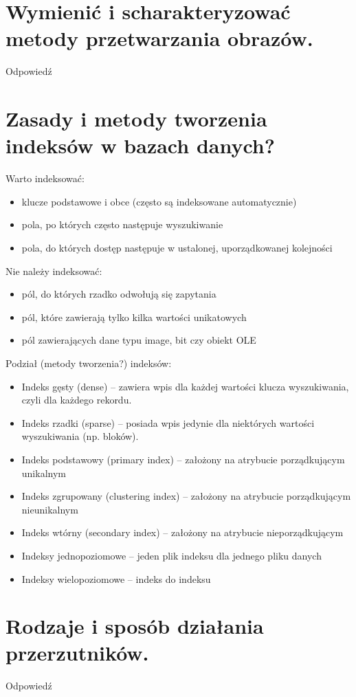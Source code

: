 \documentclass[12pt,a4paper]{article}
\begin{document}
	\section{Wymienić i scharakteryzować metody przetwarzania obrazów.}
	Odpowiedź

	\section{Zasady i metody tworzenia indeksów w bazach danych?}
	Warto indeksować:
	\begin{itemize}
		\item klucze podstawowe i obce (często są indeksowane automatycznie)
		\item pola, po których często następuje wyszukiwanie
		\item pola, do których dostęp następuje w ustalonej, uporządkowanej kolejności
	\end{itemize}
	Nie należy indeksować:
	\begin{itemize}
		\item pól, do których rzadko odwołują się zapytania
		\item pól, które zawierają tylko kilka wartości unikatowych
		\item pól zawierających dane typu image, bit czy obiekt OLE 
	\end{itemize}

	Podział (metody tworzenia?) indeksów:
	\begin{itemize}
		\item Indeks gęsty (dense) – zawiera wpis dla każdej wartości klucza wyszukiwania, czyli dla każdego rekordu.
		\item Indeks rzadki (sparse) – posiada wpis jedynie dla niektórych wartości wyszukiwania (np. bloków).
		\item Indeks podstawowy (primary index) – założony na atrybucie porządkującym unikalnym
		\item Indeks zgrupowany (clustering index) – założony na atrybucie porządkującym nieunikalnym
		\item Indeks wtórny (secondary index) – założony na atrybucie nieporządkującym
		\item Indeksy jednopoziomowe – jeden plik indeksu dla jednego pliku danych
		\item Indeksy wielopoziomowe – indeks do indeksu
	\end{itemize}

	\section{Rodzaje i sposób działania przerzutników.}
	Odpowiedź
\end{document}
